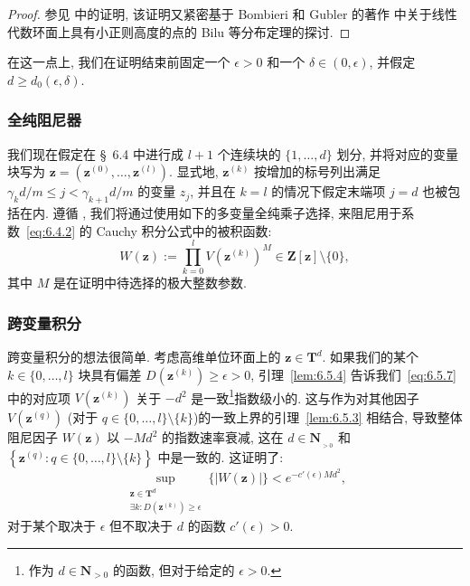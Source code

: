 \begin{proof}
参见 \cite[Lemma 2.5.8]{CDT21} 中的证明, 该证明又紧密基于 Bombieri 和 Gubler 的著作 \cite[page 103]{BG06} 中关于线性代数环面上具有小正则高度的点的 Bilu 等分布定理的探讨.
\end{proof}

在这一点上, 我们在证明结束前固定一个 $\epsilon > 0$ 和一个 $\delta \in (0, \epsilon)$, 并假定 $d \geq d_0(\epsilon, \delta)$.

\subsubsection{全纯阻尼器}\label{sec:6.5.6}

我们现在假定在 \S~6.4 中进行成 $l+1$ 个连续块的 $\{1, \ldots, d\}$ 划分, 并将对应的变量块写为 $\mathbf{z} = (\mathbf{z}^{(0)}, \ldots, \mathbf{z}^{(l)})$.
显式地, $\mathbf{z}^{(k)}$ 按增加的标号列出满足 $\gamma_k d/m \leq j < \gamma_{k+1} d/m$ 的变量 $z_j$, 并且在 $k = l$ 的情况下假定末端项 $j = d$ 也被包括在内.
遵循 \cite[§ 2.5.14]{CDT21}, 我们将通过使用如下的多变量全纯乘子选择, 来阻尼用于系数~\eqref{eq:6.4.2} 的 Cauchy 积分公式中的被积函数:
\begin{equation}\label{eq:6.5.7}
W(\mathbf{z}) := \prod_{k=0}^{l} V\left(\mathbf{z}^{(k)}\right)^{M} \in \mathbf{Z}[\mathbf{z}] \setminus \{0\},
\end{equation}
其中 $M$ 是在证明中待选择的极大整数参数.

\subsubsection{跨变量积分}\label{sec:6.5.8}

跨变量积分的想法很简单.
考虑高维单位环面上的 $\mathbf{z} \in \mathbf{T}^d$.
如果我们的某个 $k \in \{0,\dots,l\}$ 块具有偏差 $D\left(\mathbf{z}^{(k)}\right) \geq \epsilon > 0$, 引理~\ref{lem:6.5.4} 告诉我们~\eqref{eq:6.5.7} 中的对应项 $V\left(\mathbf{z}^{(k)}\right)$ 关于 $-d^2$ 是一致\footnote{作为 $d \in \mathbf{N}_{>0}$ 的函数, 但对于给定的 $\epsilon > 0$.}指数级小的.
这与作为对其他因子 $V\left(\mathbf{z}^{(q)}\right)$ (对于 $q \in \{0,\dots,l\} \setminus \{k\}$)的一致上界的引理~\ref{lem:6.5.3} 相结合, 导致整体阻尼因子 $W(\mathbf{z})$ 以 $-Md^2$ 的指数速率衰减, 这在 $d \in \mathbf{N}_{_{>0}}$ 和 $\left\{\mathbf{z}^{(q)}: q \in \{0,\dots,l\} \setminus \{k\}\right\}$ 中是一致的.
这证明了:
\begin{equation}\label{eq:6.5.9}
\sup_{\substack{\mathbf{z} \in \mathbf{T}^d \\ \exists k: D(\mathbf{z}^{(k)}) \ge \epsilon}} \{|W(\mathbf{z})|\} < e^{-c'(\epsilon)M d^2},
\end{equation}
对于某个取决于 $\epsilon$ 但不取决于 $d$ 的函数 $c'(\epsilon) > 0$.

